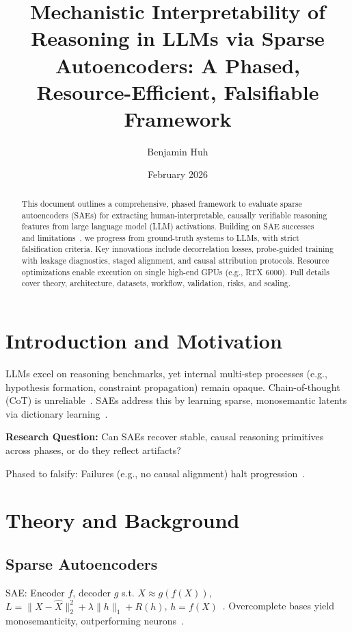 \documentclass{article}
\title{Mechanistic Interpretability of Reasoning in LLMs via Sparse Autoencoders: A Phased, Resource-Efficient, Falsifiable Framework}
\author{Benjamin Huh}
\date{February 2026}
\begin{document}
\maketitle

\begin{abstract}
This document outlines a comprehensive, phased framework to evaluate sparse autoencoders (SAEs) for extracting human-interpretable, causally verifiable reasoning features from large language model (LLM) activations. Building on SAE successes~\citep{AnthropicMappingMind} and limitations~\citep{SAE-Identifiability,SAE-Random,SAE-Empirical}, we progress from ground-truth systems to LLMs, with strict falsification criteria. Key innovations include decorrelation losses, probe-guided training with leakage diagnostics, staged alignment, and causal attribution protocols. Resource optimizations enable execution on single high-end GPUs (e.g., RTX 6000). Full details cover theory, architecture, datasets, workflow, validation, risks, and scaling.
\end{abstract}

\section{Introduction and Motivation}
LLMs excel on reasoning benchmarks, yet internal multi-step processes (e.g., hypothesis formation, constraint propagation) remain opaque. Chain-of-thought (CoT) is unreliable~\citep{Shu2025SurveySAE}. SAEs address this by learning sparse, monosemantic latents via dictionary learning~\citep{AnthropicMappingMind,ScalingMonosemanticityBlog}.

\textbf{Research Question:} Can SAEs recover stable, causal reasoning primitives across phases, or do they reflect artifacts?

Phased to falsify: Failures (e.g., no causal alignment) halt progression~\citep{SAE-Identifiability,SAE-Random}.

\section{Theory and Background}
\subsection{Sparse Autoencoders}
SAE: Encoder $f$, decoder $g$ s.t. $X \approx g(f(X))$, $L = \|X - \hat{X}\|_2^2 + \lambda \|h\|_1 + R(h)$, $h = f(X)$~\citep{Shu2025SurveySAE}. Overcomplete bases yield monosemanticity, outperforming neurons~\citep{AnthropicMappingMind,SAE-Monosemantic}.
\end{document}

